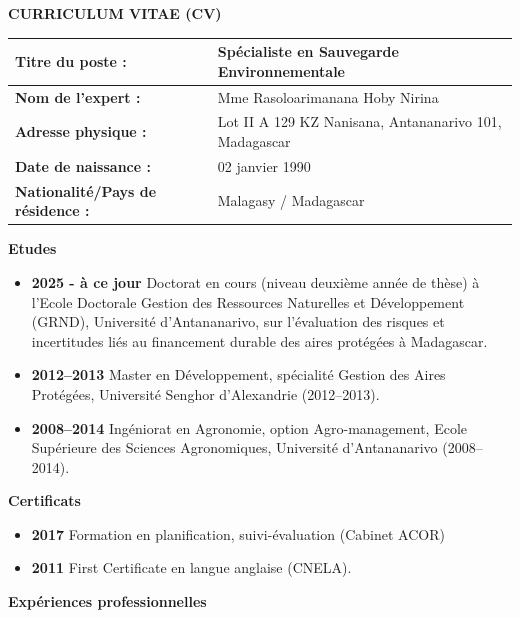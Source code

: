 \documentclass[10pt,a4paper]{article}
\newcommand{\fieldlabel}[1]{\textbf{#1}}
\begin{document}
\pagestyle{empty}

\begin{center}
{\Large\textbf{CURRICULUM VITAE (CV)}}
\end{center}

\vspace{0.45em}
\begin{tabularx}{\textwidth}{|L{4.35cm}|Y|}
\hline
{}\fieldlabel{Titre du poste :} &Spécialiste en Sauvegarde Environnementale \\\hline
\fieldlabel{Nom de l'expert :} & Mme Rasoloarimanana Hoby Nirina \\\hline
\fieldlabel{Adresse physique :} & Lot II A 129 KZ Nanisana, Antananarivo 101, Madagascar \\\hline
\fieldlabel{Date de naissance :} & 02 janvier 1990 \\\hline
\fieldlabel{Nationalit\'e/Pays de r\'esidence :} & Malagasy / Madagascar \\\hline
\end{tabularx}

\vspace{0.65em}
\fieldlabel{\large Etudes} 
\begin{itemize}
\item \textbf{2025 - à ce jour} Doctorat en cours (niveau deuxi\`eme ann\'ee de th\`ese) \`a l'Ecole Doctorale Gestion des Ressources Naturelles et D\'eveloppement (GRND), Universit\'e d'Antananarivo, sur l'\'evaluation des risques et incertitudes li\'es au financement durable des aires prot\'eg\'ees \`a Madagascar.
\item \textbf{2012--2013}  Master en D\'eveloppement, sp\'ecialit\'e Gestion des Aires Prot\'eg\'ees, Universit\'e Senghor d'Alexandrie (2012--2013). 
\item \textbf{2008--2014} Ing\'eniorat en Agronomie, option Agro-management, Ecole Sup\'erieure des Sciences Agronomiques, Universit\'e d'Antananarivo (2008--2014).
\end{itemize}

\vspace{0.65em}
\fieldlabel{\large Certificats} 
\begin{itemize}
\item \textbf{2017} Formation en planification, suivi-\'evaluation (Cabinet ACOR)  
\item \textbf{2011}  First Certificate en langue anglaise (CNELA).
\end{itemize}


\vspace{0.65em}
\fieldlabel{\large Exp\'eriences professionnelles }
\end{document}
